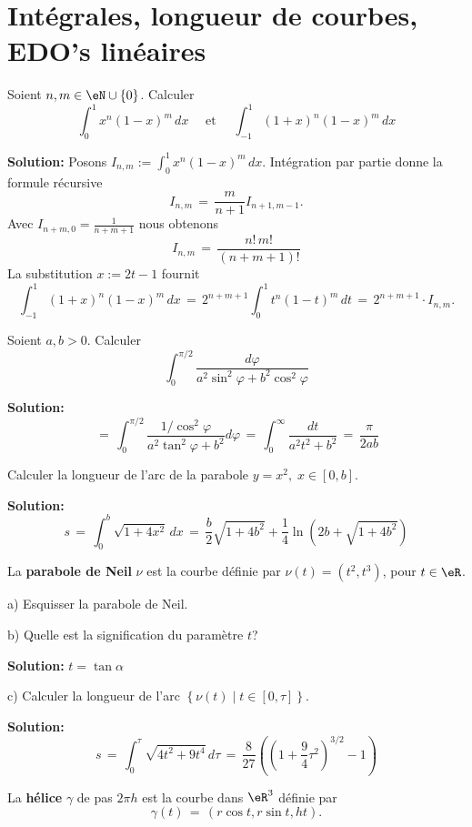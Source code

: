 \section{Intégrales, longueur de courbes, EDO's linéaires}


\exerNico 
Soient $n,m \in \eN \cup \{0\}$.
Calculer
$$
\int_0^1 x^n (1-x)^m \,dx
\quad \text{ et } \quad
\int_{-1}^1 (1+x)^n (1-x)^m \,dx
$$

{\bf Solution:}
Posons $I_{n,m} := \int_0^1 x^n (1-x)^m \,dx$.
Intégration par partie donne
la formule récursive
$$
I_{n,m} \,=\, \frac {m}{n+1} I_{n+1,m-1}.
$$
Avec $I_{n+m,0} = \frac{1}{n+m+1}$ nous obtenons
$$
I_{n,m} \,=\, \frac{n!\,m!}{(n+m+1)!}
$$
La substitution $x := 2t-1$ fournit
$$
\int_{-1}^1 (1+x)^n (1-x)^m \,dx
\,=\, 2^{n+m+1} \int_0^1 t^n (1-t)^m \,dt \,=\,  2^{n+m+1}
\cdot I_{n,m}.
$$




\exerNico 
Soient $a,b >0$.
Calculer
$$
\int_0^{\pi /2} \displaystyle \frac{d \varphi}{a^2 \sin^2 \varphi + b^2 \cos^2 \varphi}
$$

{\bf Solution:}
$$
\,=\, \int_0^{\pi /2} \frac{1 / \cos^2 \varphi}{a^2 \tan^2 \varphi+b^2} d\varphi \,=\, \int_0^\infty \frac {dt}{a^2t^2 + b^2} \,=\, \frac{\pi}{2ab}
$$


\exerNico 
Calculer la longueur de l'arc de la parabole $y = x^2,\;x \in [0,b]$.

\medskip
{\bf Solution:}
$$
s \,=\, \int_0^b \sqrt{1+4x^2} \,dx \,=\, \frac b 2 \sqrt{1+4b^2}+ \frac 14 \ln \left(2b+ \sqrt{1+4b^2} \right)
$$


\exerNico 
La {\bf parabole de Neil} $\nu$ est la courbe définie par $\nu (t) = (t^2,t^3)$, pour  $t \in \eR$.

\medskip
a)
Esquisser la parabole de Neil.

\medskip
b)
Quelle est la signification du paramètre $t$?

\medskip
{\bf Solution:} $t = \tan \alpha$

\medskip
c)
Calculer la longueur de l'arc
$\left\{ \nu (t) \mid t \in [0,\tau] \right\}$.


\medskip
{\bf Solution:}
$$
s \,=\, \int_0^\tau \sqrt{4 t^2+9t^4} \,d\tau \,=\, \frac{8}{27} \left( \left(1+ \frac 94 \tau^2\right)^{3/2}-1 \right)
$$



\exerNico
La {\bf hélice} $\gamma$ de pas $2 \pi h$ est la courbe dans $\eR^3$ définie par
$$
\gamma(t) \,=\, \left( r \cos t , r \sin t , h t \right)  .
$$


